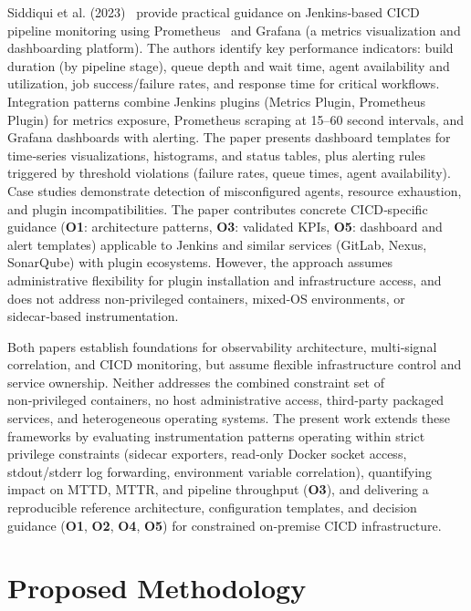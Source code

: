 \documentclass[12pt]{article}
\begin{document}
Siddiqui et al. (2023)~\cite{siddiqui2023jenkins} provide practical guidance on Jenkins‑based \ac{CICD} pipeline monitoring using Prometheus~\cite{prometheus2016} and Grafana (a metrics visualization and dashboarding platform). The authors identify key performance indicators: build duration (by pipeline stage), queue depth and wait time, agent availability and utilization, job success/failure rates, and response time for critical workflows. Integration patterns combine Jenkins plugins (Metrics Plugin, Prometheus Plugin) for metrics exposure, Prometheus scraping at 15–60 second intervals, and Grafana dashboards with alerting. The paper presents dashboard templates for time‑series visualizations, histograms, and status tables, plus alerting rules triggered by threshold violations (failure rates, queue times, agent availability). Case studies demonstrate detection of misconfigured agents, resource exhaustion, and plugin incompatibilities. The paper contributes concrete \ac{CICD}‑specific guidance (\textbf{O1}: architecture patterns, \textbf{O3}: validated KPIs, \textbf{O5}: dashboard and alert templates) applicable to Jenkins and similar services (GitLab, Nexus, SonarQube) with plugin ecosystems. However, the approach assumes administrative flexibility for plugin installation and infrastructure access, and does not address non‑privileged containers, mixed‑OS environments, or sidecar‑based instrumentation.

Both papers establish foundations for observability architecture, multi‑signal correlation, and \ac{CICD} monitoring, but assume flexible infrastructure control and service ownership. Neither addresses the combined constraint set of non‑privileged containers, no host administrative access, third‑party packaged services, and heterogeneous operating systems. The present work extends these frameworks by evaluating instrumentation patterns operating within strict privilege constraints (sidecar exporters, read‑only Docker socket access, stdout/stderr log forwarding, environment variable correlation), quantifying impact on \ac{MTTD}, \ac{MTTR}, and pipeline throughput (\textbf{O3}), and delivering a reproducible reference architecture, configuration templates, and decision guidance (\textbf{O1}, \textbf{O2}, \textbf{O4}, \textbf{O5}) for constrained on‑premise \ac{CICD} infrastructure.


\section{Proposed Methodology}
\end{document}
